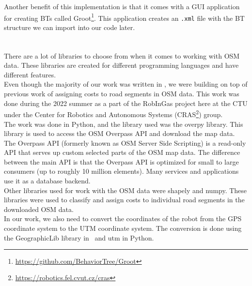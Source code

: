         Another benefit of this implementation is that it comes with a GUI application for creating BTs called Groot\footnote{\url{https://github.com/BehaviorTree/Groot}}. This application creates an \texttt{.xml} file with the BT structure we can import into our code later.\\\\
    \\
        There are a lot of libraries to choose from when it comes to working with OSM data. These libraries are created for different programming languages and have different features.\\
        Even though the majority of our work was written in \CC, we were building on top of previous work of assigning costs to road segments in OSM data. This work was done during the 2022 summer as a part of the RobInGas project here at the CTU under the Center for Robotics and Autonomous Systems (CRAS\footnote{\url{https://robotics.fel.cvut.cz/cras}}) group.\\
        The work was done in Python, and the library used was the overpy library. This library is used to access the OSM Overpass API and download the map data. The Overpass API (formerly known as OSM Server Side Scripting) is a read-only API that serves up custom selected parts of the OSM map data. The difference between the main API is that the Overpass API is optimized for small to large consumers (up to roughly 10 million elements). Many services and applications use it as a database backend.\cite{Overpass}\\
        Other libraries used for work with the OSM data were shapely and numpy. These libraries were used to classify and assign costs to individual road segments in the downloaded OSM data.\\
        In our work, we also need to convert the coordinates of the robot from the GPS coordinate system to the UTM coordinate system. The conversion is done using the GeographicLib library in \CC\ and utm in Python.